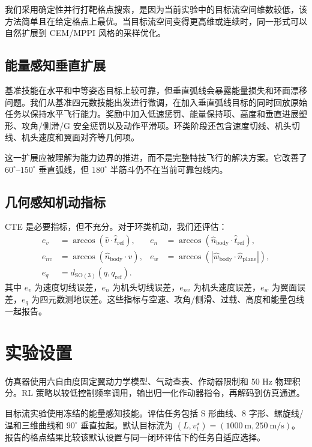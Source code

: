 \documentclass{article}
\newcommand{\vt}{v_t}
\begin{document}
我们采用确定性并行打靶格点搜索，是因为当前实验中的目标流空间维数较低，该方法简单且在给定格点上最优。当目标流空间变得更高维或连续时，同一形式可以自然扩展到 CEM/MPPI 风格的采样优化。

\subsection{能量感知垂直扩展}

基准技能在水平和中等姿态目标上较可靠，但垂直弧线会暴露能量损失和环面漂移问题。我们从基准四元数技能出发进行微调，在加入垂直弧线目标的同时回放原始任务以保持水平飞行能力。奖励中加入低速惩罚、能量保持项、高度和垂直进展塑形、攻角/侧滑/G 安全惩罚以及动作平滑项。环类阶段还包含速度切线、机头切线、机头速度和翼面对齐等几何项。

这一扩展应被理解为能力边界的推进，而不是完整特技飞行的解决方案。它改善了 $60^\circ$--$150^\circ$ 垂直弧线，但 $180^\circ$ 半筋斗仍不在当前可靠包线内。

\subsection{几何感知机动指标}

CTE 是必要指标，但不充分。对于环类机动，我们还评估：
\begin{align}
  e_v &= \arccos(\hat v \cdot \hat t_{\mathrm{ref}}), &
  e_n &= \arccos(\hat n_{\mathrm{body}} \cdot \hat t_{\mathrm{ref}}), \\
  e_{nv} &= \arccos(\hat n_{\mathrm{body}} \cdot \hat v), &
  e_w &= \arccos(|\hat w_{\mathrm{body}} \cdot \hat n_{\mathrm{plane}}|), \\
  e_q &= d_{\mathrm{SO(3)}}(q,q_{\mathrm{ref}}).
\end{align}
其中 $e_v$ 为速度切线误差，$e_n$ 为机头切线误差，$e_{nv}$ 为机头速度误差，$e_w$ 为翼面误差，$e_q$ 为四元数测地误差。这些指标与空速、攻角/侧滑、过载、高度和能量包线一起报告。


\section{实验设置}

仿真器使用六自由度固定翼动力学模型、气动查表、作动器限制和 50 Hz 物理积分。RL 策略以较低控制频率调用，输出归一化作动器指令，再解码到仿真通道。

目标流实验使用冻结的能量感知技能。评估任务包括 S 形曲线、8 字形、螺旋线/温和三维曲线和 $90^\circ$ 垂直拉起。默认目标流为 $(L,\vt^\star)=(1000~\mathrm{m},250~\mathrm{m/s})$。报告的格点结果比较该默认设置与同一闭环评估下的任务自适应选择。
\end{document}

